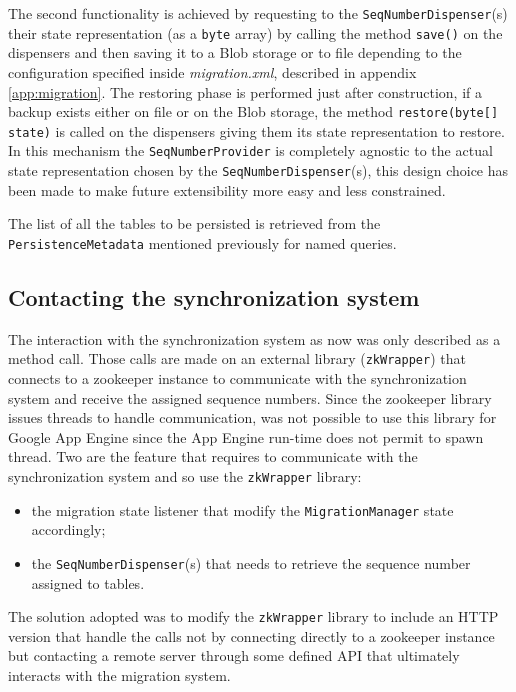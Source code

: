 \newparagraph The second functionality is achieved by requesting to the \texttt{SeqNumberDispenser}(s) their state representation (as a \texttt{byte} array) by calling the method \texttt{save()} on the dispensers and then saving it to a Blob storage or to file depending to the configuration specified inside \textit{migration.xml}, described in appendix \ref{app:migration}. 
\noindent The restoring phase is performed just after construction, if a backup exists either on file or on the Blob storage, the method \texttt{restore(byte[] state)} is called on the dispensers giving them its state representation to restore.
In this mechanism the \texttt{SeqNumberProvider} is completely agnostic to the actual state representation chosen by the \texttt{SeqNumberDispenser}(s), this design choice has been made to make future extensibility more easy and less constrained.

\noindent The list of all the tables to be persisted is retrieved from the \texttt{PersistenceMetadata} mentioned previously for named queries.
 
\subsection{Contacting the synchronization system}
The interaction with the synchronization system as now was only described as a method call. Those calls are made on an external library (\texttt{zkWrapper}) that connects to a zookeeper instance to communicate with the synchronization system and receive the assigned sequence numbers.
Since the zookeeper library issues threads to handle communication, was not possible to use this library for Google App Engine since the App Engine run-time does not permit to spawn thread.
Two are the feature that requires to communicate with the synchronization system and so use the \texttt{zkWrapper} library:
\begin{itemize}
\item the migration state listener that modify the \texttt{MigrationManager} state accordingly;
\item the \texttt{SeqNumberDispenser}(s) that needs to retrieve the sequence number assigned to tables.
\end{itemize} 
\noindent The solution adopted was to modify the \texttt{zkWrapper} library to include an HTTP version that handle the calls not by connecting directly to a zookeeper instance but contacting a remote server through some defined API that ultimately interacts with the migration system.

